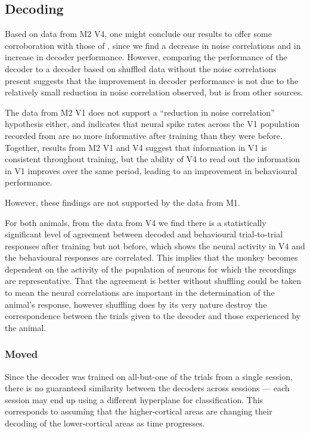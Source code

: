 \subsection{Decoding}

Based on data from \ac{M2} \ac{V4}, one might conclude our results to offer some corroboration with those of \citet{Gu2011}, since we find a decrease in noise correlations and in increase in decoder performance.
However, comparing the performance of the decoder to a decoder based on shuffled data without the noise correlations present suggests that the improvement in decoder performance is not due to the relatively small reduction in noise correlation observed, but is from other sources.

The data from \ac{M2} \ac{V1} does not support a ``reduction in noise correlation'' hypothesis either, and indicates that neural spike rates across the \ac{V1} population recorded from are no more informative after training than they were before.
Together, results from \ac{M2} \ac{V1} and \ac{V4} suggest that information in \ac{V1} is consistent throughout training, but the ability of \ac{V4} to read out the information in \ac{V1} improves over the same period, leading to an improvement in behavioural performance.

However, these findings are not supported by the data from \ac{M1}.


For both animals, from the data from \ac{V4} we find there is a statistically significant level of agreement between decoded and behavioural trial-to-trial responses after training but not before, which shows the neural activity in \ac{V4} and the behavioural responses are correlated.
This implies that the monkey becomes dependent on the activity of the population of neurons for which the recordings are representative.
That the agreement is better without shuffling could be taken to mean the neural correlations are important in the determination of the animal's response, however shuffling does by its very nature destroy the correspondence between the trials given to the decoder and those experienced by the animal.


\subsubsection{Moved}

Since the decoder was trained on all-but-one of the trials from a single session, there is no guaranteed similarity between the decoders across sessions --- each session may end up using a different hyperplane for classification.
This corresponds to assuming that the higher-cortical areas are changing their decoding of the lower-cortical areas as time progresses.
